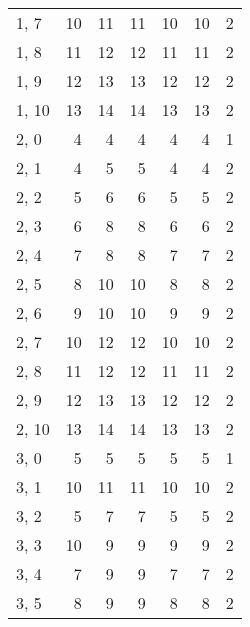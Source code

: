 \begin{table}
\begin{tabular}{lrrrrrr}
1, 7   &          10 &           11 &         11 &           10 &        10 &      2 \\
1, 8   &          11 &           12 &         12 &           11 &        11 &      2 \\
1, 9   &          12 &           13 &         13 &           12 &        12 &      2 \\
1, 10  &          13 &           14 &         14 &           13 &        13 &      2 \\
2, 0   &           4 &            4 &          4 &            4 &         4 &      1 \\
2, 1   &           4 &            5 &          5 &            4 &         4 &      2 \\
2, 2   &           5 &            6 &          6 &            5 &         5 &      2 \\
2, 3   &           6 &            8 &          8 &            6 &         6 &      2 \\
2, 4   &           7 &            8 &          8 &            7 &         7 &      2 \\
2, 5   &           8 &           10 &         10 &            8 &         8 &      2 \\
2, 6   &           9 &           10 &         10 &            9 &         9 &      2 \\
2, 7   &          10 &           12 &         12 &           10 &        10 &      2 \\
2, 8   &          11 &           12 &         12 &           11 &        11 &      2 \\
2, 9   &          12 &           13 &         13 &           12 &        12 &      2 \\
2, 10  &          13 &           14 &         14 &           13 &        13 &      2 \\
3, 0   &           5 &            5 &          5 &            5 &         5 &      1 \\
3, 1   &          10 &           11 &         11 &           10 &        10 &      2 \\
3, 2   &           5 &            7 &          7 &            5 &         5 &      2 \\
3, 3   &          10 &            9 &          9 &            9 &         9 &      2 \\
3, 4   &           7 &            9 &          9 &            7 &         7 &      2 \\
3, 5   &           8 &            9 &          9 &            8 &         8 &      2 \\

\end{tabular}
\end{table}
